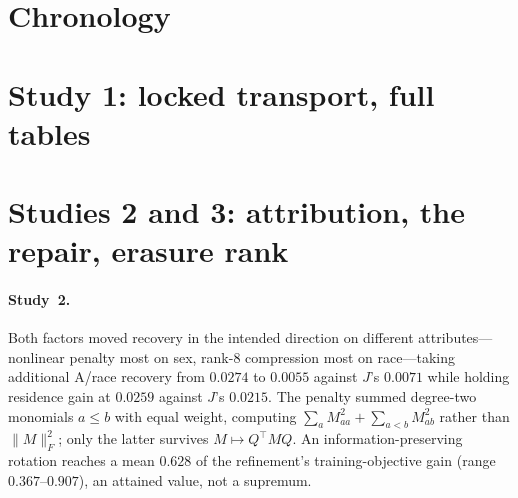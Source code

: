 \documentclass[10pt]{article}
\begin{document}
\section{Chronology}
\begin{table}[H]
\centering\footnotesize

\caption{The six studies, with evidence commits and what each is evidence for.}
\label{tab:chronology}
\end{table}

\section{Study 1: locked transport, full tables}
\label{app:study1}
\begin{center}\small\end{center}
\begin{center}\small\end{center}
\begin{center}\small\end{center}
\begin{center}\small\end{center}
\begin{center}\small\end{center}
\begin{center}\small\end{center}

\section{Studies 2 and 3: attribution, the repair, erasure rank}
\label{app:study23}
\paragraph{Study~2.} Both factors moved recovery in the intended direction on different attributes---nonlinear
penalty most on sex, rank-8 compression most on race---taking additional A/race recovery from $0.0274$ to
$0.0055$ against $J$'s $0.0071$ while holding residence gain at $0.0259$ against $J$'s $0.0215$. The penalty
summed degree-two monomials $a\le b$ with equal weight, computing $\sum_a M_{aa}^2+\sum_{a<b}M_{ab}^2$ rather
than $\|M\|_F^2$; only the latter survives $M\mapsto Q^\top MQ$. An information-preserving rotation reaches a
mean $0.628$ of the refinement's training-objective gain (range $0.367$--$0.907$), an attained value, not a
supremum.
\end{document}
